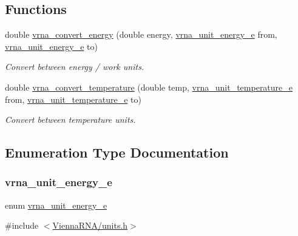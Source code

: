 \subsection*{Functions}
\begin{DoxyCompactItemize}
\item 
double \hyperlink{group__units_gada3216e97b410928ba19a4487e5fe6f2}{vrna\+\_\+convert\+\_\+energy} (double energy, \hyperlink{group__units_ga1d2fd1e73caf995e4dc69072b33e6ba5}{vrna\+\_\+unit\+\_\+energy\+\_\+e} from, \hyperlink{group__units_ga1d2fd1e73caf995e4dc69072b33e6ba5}{vrna\+\_\+unit\+\_\+energy\+\_\+e} to)
\begin{DoxyCompactList}\small\item\em Convert between energy / work units. \end{DoxyCompactList}\item 
double \hyperlink{group__units_gaf1bb1db32eba33b9f306214f5955d0c2}{vrna\+\_\+convert\+\_\+temperature} (double temp, \hyperlink{group__units_gadeca8d9e91ef85f1b652cc8aef63d7e4}{vrna\+\_\+unit\+\_\+temperature\+\_\+e} from, \hyperlink{group__units_gadeca8d9e91ef85f1b652cc8aef63d7e4}{vrna\+\_\+unit\+\_\+temperature\+\_\+e} to)
\begin{DoxyCompactList}\small\item\em Convert between temperature units. \end{DoxyCompactList}\end{DoxyCompactItemize}


\subsection{Enumeration Type Documentation}
\mbox{\label{group__units_ga1d2fd1e73caf995e4dc69072b33e6ba5}} 
\subsubsection{\texorpdfstring{vrna\+\_\+unit\+\_\+energy\+\_\+e}{vrna\_unit\_energy\_e}}
{\footnotesize\ttfamily enum \hyperlink{group__units_ga1d2fd1e73caf995e4dc69072b33e6ba5}{vrna\+\_\+unit\+\_\+energy\+\_\+e}}



{\ttfamily \#include $<$\hyperlink{units_8h}{Vienna\+R\+N\+A/units.\+h}$>$}



